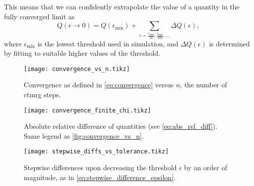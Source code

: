 This means that we can confidently extrapolate the value of a quantity in the fully converged limit as
\begin{equation}
  Q(\epsilon \to 0) = Q(\epsilon_{\text{min}}) + \sum_{\epsilon = \frac{\epsilon_{\text{min}}}{10},
  \frac{\epsilon_{\text{min}}}{100}, \dots} \Delta Q(\epsilon),
\end{equation}
where $\epsilon_{\text{min}}$ is the lowest threshold used in simulation, and $\Delta Q(\epsilon)$ is determined
by fitting to suitable higher values of the threshold.




\begin{figure}
  \texttt{[image: convergence\_vs\_n.tikz]}
  \caption{Convergence as defined in \autoref{eq:convergence} versus $n$, the number of ctmrg
  steps.}\label{fig:convergence_vs_n}
\end{figure}

\begin{figure}
  \texttt{[image: convergence\_finite\_chi.tikz]}
  \caption{Absolute relative difference of quantities (see \autoref{eq:abs_rel_diff}).
  Same legend as \autoref{fig:convergence_vs_n}.}\label{fig:convergence_finite_chi}
\end{figure}


\begin{figure}
  \texttt{[image: stepwise\_diffs\_vs\_tolerance.tikz]}
  \caption{Stepwise differences upon decreasing the threshold $\epsilon$ by an order of magnitude,
  as in \autoref{eq:stepwise_difference_epsilon}. }\label{fig:stepwise_diffs_vs_tolerance}
\end{figure}




